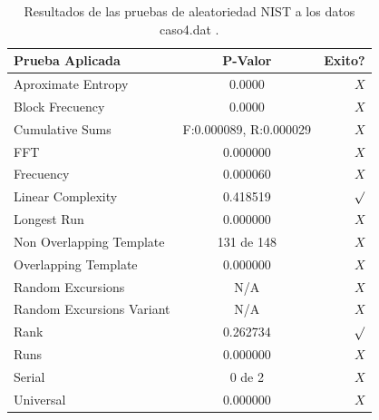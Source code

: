 \documentclass[10pt]{IEEEtran}
\begin{document}
\begin{table}[H]
\caption{Resultados de las pruebas de aleatoriedad NIST a los datos caso4.dat .}
\label{caso1}
\begin{center}
\begin{small}
\begin{tabular}{|l|c|r|}
\hline

Prueba Aplicada &  P-Valor & Exito? \\
\hline

Aproximate Entropy    &    0.0000 & $X$ \\

Block Frecuency  & 0.0000  &  $X$  \\

Cumulative Sums    &   F:0.000089, R:0.000029   & $X$ \\

FFT    &   0.000000 &   $X$      \\

Frecuency     &  0.000060 &  $X$   \\

Linear Complexity      & 0.418519  & $\surd$ \\

Longest Run      &    0.000000 &    $X$      \\

Non Overlapping Template      & 131 de 148    &     $X$          \\

Overlapping Template      &   0.000000  &       $X$        \\

Random Excursions      & N/A  &    $X$      \\

Random Excursions Variant & N/A &     $X$    \\

Rank &  0.262734 &      $\surd$      \\

Runs &      0.000000  &     $X$        \\

Serial &     0 de 2    &     $X$        \\

Universal &       0.000000 &   $X$            \\

\hline

\end{tabular}
\end{small}
\end{center}
\end{table}
\end{document}
